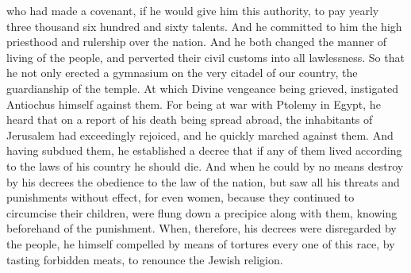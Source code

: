 {who had made a covenant, if he would give him this authority, to pay yearly three thousand six hundred and sixty talents.
And he committed to him the high priesthood and rulership over the nation.
And he both changed the manner of living of the people, and perverted their civil customs into all lawlessness.
So that he not only erected a gymnasium on the very citadel of our country,
{} the guardianship of the temple.
At which Divine vengeance being grieved, instigated Antiochus himself against them.
For being at war with Ptolemy in Egypt, he heard that on a report of his death being spread abroad, the inhabitants of Jerusalem had exceedingly rejoiced, and he quickly marched against them.
And having subdued them, he established a decree that if any of them lived according to the laws of his country he should die.
And when he could by no means destroy by his decrees the obedience to the law of the nation, but saw all his threats and punishments without effect,
for even women, because they continued to circumcise their children, were flung down a precipice along with them, knowing beforehand of the punishment.
When, therefore, his decrees were disregarded by the people, he himself compelled by means of tortures every one of this race, by tasting forbidden meats, to renounce the Jewish religion.

}
